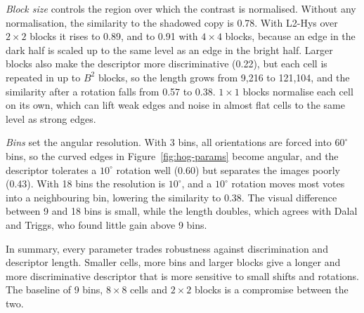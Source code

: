 \emph{Block size} controls the region over which the contrast is normalised. Without any normalisation, the similarity to the shadowed copy is 0.78. With L2-Hys over $2\times2$ blocks it rises to 0.89, and to 0.91 with $4\times4$ blocks, because an edge in the dark half is scaled up to the same level as an edge in the bright half. Larger blocks also make the descriptor more discriminative (0.22), but each cell is repeated in up to $B^2$ blocks, so the length grows from 9,216 to 121,104, and the similarity after a rotation falls from 0.57 to 0.38. $1\times1$ blocks normalise each cell on its own, which can lift weak edges and noise in almost flat cells to the same level as strong edges.

\emph{Bins} set the angular resolution. With 3 bins, all orientations are forced into $60^\circ$ bins, so the curved edges in Figure~\ref{fig:hog-params} become angular, and the descriptor tolerates a $10^\circ$ rotation well (0.60) but separates the images poorly (0.43). With 18 bins the resolution is $10^\circ$, and a $10^\circ$ rotation moves most votes into a neighbouring bin, lowering the similarity to 0.38. The visual difference between 9 and 18 bins is small, while the length doubles, which agrees with Dalal and Triggs, who found little gain above 9 bins.

In summary, every parameter trades robustness against discrimination and descriptor length. Smaller cells, more bins and larger blocks give a longer and more discriminative descriptor that is more sensitive to small shifts and rotations. The baseline of 9 bins, $8\times8$ cells and $2\times2$ blocks is a compromise between the two.
